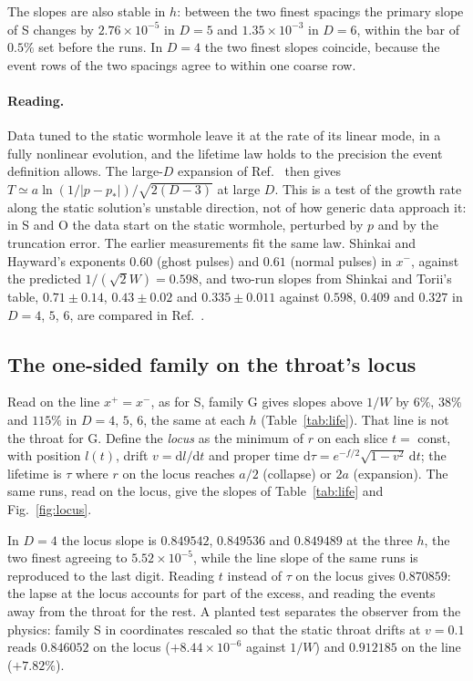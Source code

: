 \documentclass[11pt]{article}
\newcommand{\dd}{\mathrm{d}}
\begin{document}
The slopes are also stable in $h$: between the two finest spacings the primary slope of S changes by
$2.76\times10^{-5}$ in $D=5$ and $1.35\times10^{-3}$ in $D=6$, within the bar of $0.5\%$ set before the runs. In $D=4$
the two finest slopes coincide, because the event rows of the two spacings agree to within one coarse row.

\paragraph{Reading.} Data tuned to the static wormhole leave it at the rate of its linear mode, in a fully nonlinear
evolution, and the lifetime law holds to the precision the event definition allows. The large-$D$ expansion of Ref.~\cite{P3}
then gives $T\simeq a\ln(1/|p-p_*|)/\sqrt{2(D-3)}$ at large $D$. This is a test of the growth rate along the
static solution's unstable direction, not of how generic data approach it: in S and O the data start on the static
wormhole, perturbed by $p$ and by the truncation error. The earlier measurements fit the same law. Shinkai and Hayward's
exponents $0.60$ (ghost pulses) and $0.61$ (normal pulses) in $x^-$, against the predicted $1/(\sqrt2W)=0.598$, and
two-run slopes from Shinkai and Torii's table, $0.71\pm0.14$, $0.43\pm0.02$ and $0.335\pm0.011$ against $0.598$,
$0.409$ and $0.327$ in $D=4$, $5$, $6$, are compared in Ref.~\cite{P3}.

\subsection{The one-sided family on the throat's locus}\label{sec:locus}

Read on the line $x^+=x^-$, as for S, family G gives slopes above $1/W$ by $6\%$, $38\%$ and $115\%$ in $D=4$, $5$, $6$,
the same at each $h$ (Table~\ref{tab:life}). That line is not the throat for G. Define the \emph{locus} as the minimum of
$r$ on each slice $t=$ const, with position $l(t)$, drift $v=\dd l/\dd t$ and proper time
$\dd\tau=e^{-f/2}\sqrt{1-v^2}\,\dd t$; the lifetime is $\tau$ where $r$ on the locus reaches $a/2$ (collapse) or $2a$
(expansion). The same runs, read on the locus, give the slopes of Table~\ref{tab:life} and Fig.~\ref{fig:locus}.

In $D=4$ the locus slope is $0.849542$, $0.849536$ and $0.849489$ at the three $h$, the two finest agreeing to
$5.52\times10^{-5}$, while the line slope of the same runs is reproduced to the last digit. Reading $t$ instead of $\tau$
on the locus gives $0.870859$: the lapse at the locus accounts for part of the excess, and reading the events away
from the throat for the rest. A
planted test separates the observer from the physics: family S in coordinates rescaled so that the static throat drifts
at $v=0.1$ reads $0.846052$ on the locus ($+8.44\times10^{-6}$ against $1/W$) and $0.912185$ on the line ($+7.82\%$).
\end{document}
